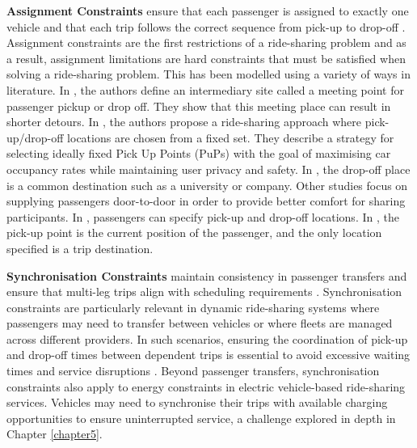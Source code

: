 \textbf{Assignment Constraints} ensure that each passenger is assigned to exactly one vehicle and that each trip follows the correct sequence from pick-up to drop-off \cite{stiglic2018enhancing163, goel2017optimal68}. Assignment constraints are the first restrictions of a ride-sharing problem and as a result, assignment limitations are hard constraints that must be satisfied when solving a ride-sharing problem. This has been modelled using a variety of ways in literature. In \cite{stiglic2018enhancing163}, the authors define an intermediary site called a meeting point for passenger pickup or drop off. They show that this meeting place can result in shorter detours. In \cite{goel2017optimal68}, the authors propose a ride-sharing approach where pick-up/drop-off locations are chosen from a fixed set. They describe a strategy for selecting ideally fixed Pick Up Points (PuPs) with the goal of maximising car occupancy rates while maintaining user privacy and safety. In \cite{naoum2015stochastic133}, the drop-off place is a common destination such as a university or company. Other studies focus on supplying passengers door-to-door in order to provide better comfort for sharing participants. In \cite{ota2017stars135, li2016share110, tachet2017scaling165}, passengers can specify pick-up and drop-off locations. In \cite{dorey2014ridesharing53, farin2016framework56, kleiner2011mechanism98}, the pick-up point is the current position of the passenger, and the only location specified is a trip destination.

\textbf{Synchronisation Constraints} maintain consistency in passenger transfers and ensure that multi-leg trips align with scheduling requirements \cite{fink2019column58, drexl2012synchronization54}. Synchronisation constraints are particularly relevant in dynamic ride-sharing systems where passengers may need to transfer between vehicles or where fleets are managed across different providers. In such scenarios, ensuring the coordination of pick-up and drop-off times between dependent trips is essential to avoid excessive waiting times and service disruptions \cite{masoud2017using126, lazzaretti2021real}. 
Beyond passenger transfers, synchronisation constraints also apply to energy constraints in electric vehicle-based ride-sharing services. Vehicles may need to synchronise their trips with available charging opportunities to ensure uninterrupted service, a challenge explored in depth in Chapter \ref{chapter5}.

